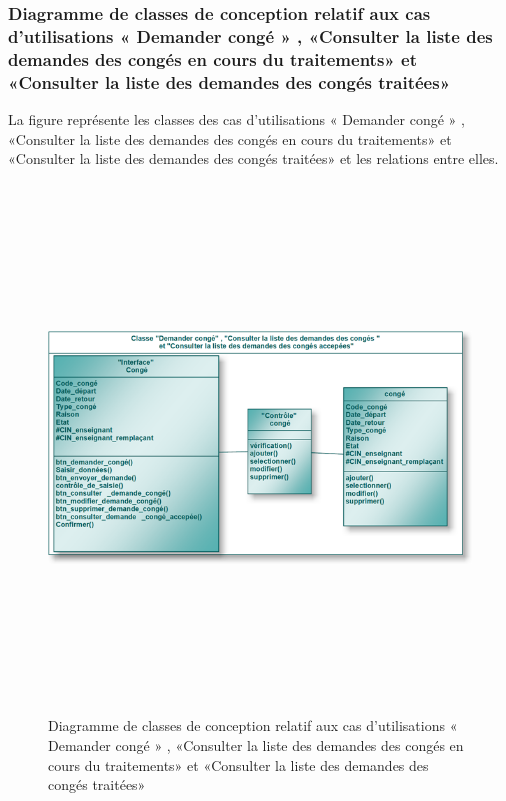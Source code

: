 \documentclass[12 pt]{report}
\begin{document}
\subsubsection{Diagramme de classes de conception relatif aux cas d'utilisations « Demander congé » , «Consulter la liste des demandes des congés en cours du traitements» et «Consulter la liste des demandes des congés traitées» }
La figure  représente les classes des cas d’utilisations « Demander congé » , «Consulter la liste des demandes des congés en cours du traitements» et «Consulter la liste des demandes des congés traitées» et les relations entre elles.
\begin{figure}[h]
 \begin{center}
\includegraphics[width= 16 cm ,height=  14cm]{cl_dc.PNG}
\caption{Diagramme de classes de conception relatif aux cas d'utilisations « Demander congé » , «Consulter la liste des demandes des congés en cours du traitements» et «Consulter la liste des demandes des congés traitées» }

\end{center}
\end{figure}
\newpage
\end{document}
